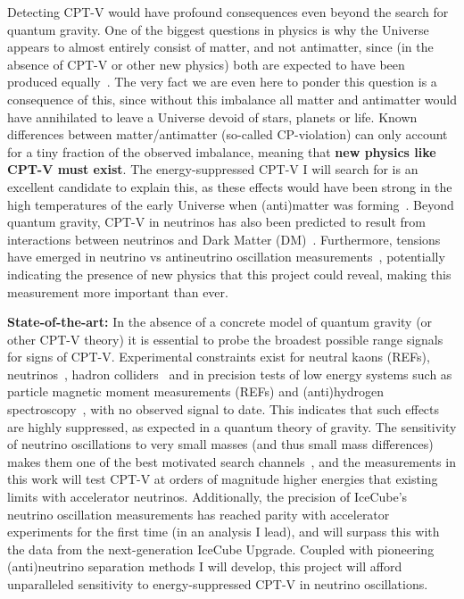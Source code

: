 \documentclass[a4paper,11pt]{article}
\begin{document}
Detecting CPT-V would have profound consequences even beyond the search for quantum gravity. One of the biggest questions in physics is why the Universe appears to almost entirely consist of matter, and not antimatter, since (in the absence of CPT-V or other new physics) both are expected to have been produced equally~\cite{Sakharov_1991}. The very fact we are even here to ponder this question is a consequence of this, since without this imbalance all matter and antimatter would have annihilated to leave a Universe devoid of stars, planets or life. Known differences between matter/antimatter (so-called CP-violation) can only account for a tiny fraction of the observed imbalance, meaning that \textbf{new physics like CPT-V must exist}. The energy-suppressed CPT-V I will search for is an excellent candidate to explain this, as these effects would have been strong in the high temperatures of the early Universe when (anti)matter was forming~\cite{Mavromatos:2017cxr, hep-ph/9809542}. Beyond quantum gravity, CPT-V in neutrinos has also been predicted to result from interactions between neutrinos and Dark Matter (DM)~\cite{Capozzi:2018bps, 1904.02518}. Furthermore, tensions have emerged in neutrino vs antineutrino oscillation measurements~\cite{Abe:2019vii,NOvA_CP_result}, potentially indicating the presence of new physics that this project could reveal, making this measurement more important than ever.


\noindent \textbf{State-of-the-art:} In the absence of a concrete model of quantum gravity (or other CPT-V theory) it is essential to probe the broadest possible range signals~\cite{hep-ph/9809542} for signs of CPT-V. Experimental constraints exist for neutral kaons (REFs), neutrinos~\cite{Adamson:2013whj, Ohlsson:2014cha}, hadron colliders~\cite{vanTilburg:2016awx} and in precision tests of low energy systems such as particle magnetic moment measurements (REFs) and (anti)hydrogen spectroscopy~\cite{Kostelecky:2015nma}, with no observed signal to date. This indicates that such effects are highly suppressed, as expected in a quantum theory of gravity.  The sensitivity of neutrino oscillations to very small masses (and thus small mass differences) makes them one of the best motivated search channels~\cite{PhysRevD.99.075022}, and the measurements in this work will test CPT-V at orders of magnitude higher energies that existing limits with accelerator neutrinos. Additionally, the precision of IceCube's neutrino oscillation measurements has reached parity with accelerator experiments for the first time (in an analysis I lead), and will surpass this with the data from the next-generation IceCube Upgrade. Coupled with pioneering (anti)neutrino separation methods I will develop, this project will afford unparalleled sensitivity to energy-suppressed CPT-V in neutrino oscillations. \\
\end{document}
